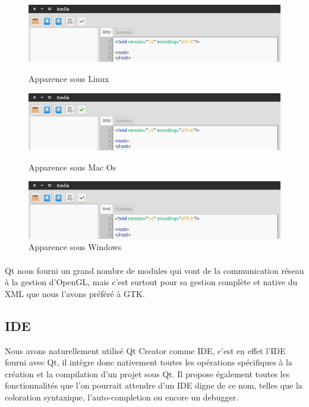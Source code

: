 \begin{figure}[h!]

\begin{minipage}[b]{\linewidth}
\centering \includegraphics[scale=0.5]{images/apparence_linux.png}
\caption{Apparence sous Linux}
\label{apparence_linux}
\end{minipage}
\begin{minipage}[b]{\linewidth}   
\centering \includegraphics[scale=0.5]{images/apparence_linux.png}
\caption{Apparence sous Mac Os}
\label{apparence_mac}
\end{minipage}
\begin{minipage}[b]{\linewidth}
\centering \includegraphics[scale=0.5]{images/apparence_linux.png}
\caption{Apparence sous Windows}
\label{apparence_windows}
\end{minipage}
\end{figure}

\paragraph{}
Qt nous fourni un grand nombre de modules qui vont de la communication réseau à la gestion d'OpenGL, mais c'est surtout pour sa gestion complète et native du XML que nous l'avons préféré à GTK.

\subsection{IDE}
Nous avons naturellement utilisé Qt Creator comme IDE, c'est en effet l'IDE fourni avec Qt, il intègre donc nativement toutes les opérations spécifiques à la création et la compilation d'un projet sous Qt. Il propose également toutes les fonctionnalités que l'on pourrait attendre d'un IDE digne de ce nom, telles que la coloration syntaxique, l'auto-completion ou encore un debugger.
